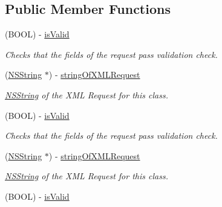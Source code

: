 \subsection*{Public Member Functions}
\begin{DoxyCompactItemize}
\item 
\hypertarget{interface_create_transaction_request_ae220346366fe451b071343ee4fee24ca}{
(BOOL) -\/ \hyperlink{interface_create_transaction_request_ae220346366fe451b071343ee4fee24ca}{isValid}}
\label{interface_create_transaction_request_ae220346366fe451b071343ee4fee24ca}

\begin{DoxyCompactList}\small\item\em Checks that the fields of the request pass validation check. \item\end{DoxyCompactList}\item 
(\hyperlink{class_n_s_string}{NSString} $\ast$) -\/ \hyperlink{interface_create_transaction_request_a2650296394067bade8916c1fac2a5819}{stringOfXMLRequest}
\begin{DoxyCompactList}\small\item\em \hyperlink{class_n_s_string}{NSString} of the XML Request for this class. \item\end{DoxyCompactList}\item 
\hypertarget{interface_create_transaction_request_ae220346366fe451b071343ee4fee24ca}{
(BOOL) -\/ \hyperlink{interface_create_transaction_request_ae220346366fe451b071343ee4fee24ca}{isValid}}
\label{interface_create_transaction_request_ae220346366fe451b071343ee4fee24ca}

\begin{DoxyCompactList}\small\item\em Checks that the fields of the request pass validation check. \item\end{DoxyCompactList}\item 
(\hyperlink{class_n_s_string}{NSString} $\ast$) -\/ \hyperlink{interface_create_transaction_request_a2650296394067bade8916c1fac2a5819}{stringOfXMLRequest}
\begin{DoxyCompactList}\small\item\em \hyperlink{class_n_s_string}{NSString} of the XML Request for this class. \item\end{DoxyCompactList}\item 
\hypertarget{interface_create_transaction_request_ae220346366fe451b071343ee4fee24ca}{
(BOOL) -\/ \hyperlink{interface_create_transaction_request_ae220346366fe451b071343ee4fee24ca}{isValid}}
\label{interface_create_transaction_request_ae220346366fe451b071343ee4fee24ca}


\end{DoxyCompactItemize}
